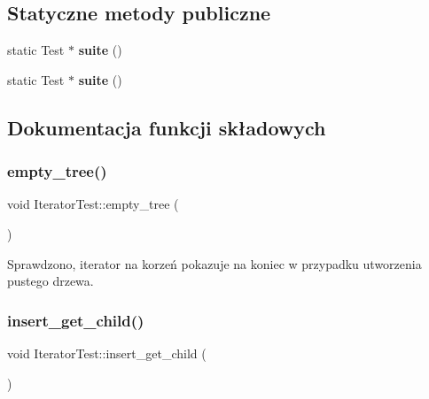 \subsection*{Statyczne metody publiczne}
\begin{DoxyCompactItemize}
\item 
\mbox{\label{class_iterator_test_a5251aa78e108a94e3b969a784a74d5e6}} 
static Test $\ast$ {\bfseries suite} ()
\item 
\mbox{\label{class_iterator_test_a5251aa78e108a94e3b969a784a74d5e6}} 
static Test $\ast$ {\bfseries suite} ()
\end{DoxyCompactItemize}


\subsection{Dokumentacja funkcji składowych}
\mbox{\label{class_iterator_test_a826f30ef86193414b8ceb03e76592b37}} 
\subsubsection{\texorpdfstring{empty\+\_\+tree()}{empty\_tree()}}
{\footnotesize\ttfamily void Iterator\+Test\+::empty\+\_\+tree (\begin{DoxyParamCaption}{ }\end{DoxyParamCaption})\hspace{0.3cm}{\ttfamily [inline]}}

Sprawdzono, iterator na korzeń pokazuje na koniec w przypadku utworzenia pustego drzewa. \mbox{\label{class_iterator_test_a12ba95e8b8465d2378afd5db43efc6e5}} 
\subsubsection{\texorpdfstring{insert\+\_\+get\+\_\+child()}{insert\_get\_child()}}
{\footnotesize\ttfamily void Iterator\+Test\+::insert\+\_\+get\+\_\+child (\begin{DoxyParamCaption}{ }\end{DoxyParamCaption})\hspace{0.3cm}{\ttfamily [inline]}}

